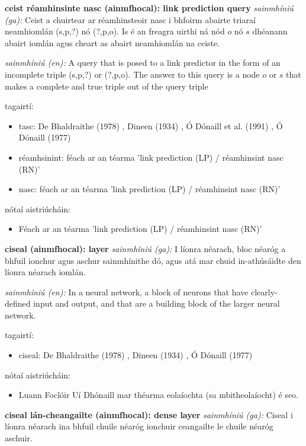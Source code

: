 \documentclass{article}
\begin{document}
\textbf{ceist réamhinsinte nasc (ainmfhocal): link prediction query}
\textit{sainmhíniú (ga):} Ceist a chuirtear ar réamhinsteoir nasc i bhfoirm abairte triaraí neamhiomlán (s,p,?) nó (?,p,o). Is é an freagra uirthi ná nód $o$ nó $s$ dhéanann abairt iomlán agus cheart as abairt neamhiomlán na ceiste.

\textit{sainmhíniú (en):} A query that is posed to a link predictor in the form of an incomplete triple (s,p,?) or (?,p,o). The answer to this query is a node $o$ or $s$ that makes a complete and true triple out of the query triple

tagairtí:
\begin{itemize}
	\item tasc: De Bhaldraithe (1978) \cite{de-bhaldraithe}, Dineen (1934) \cite{dineen}, Ó Dónaill et al. (1991) \cite{focloir-beag}, Ó Dónaill (1977) \cite{odonaill}
	\item réamhsinint: féach ar an téarma 'link prediction (LP) / réamhinsint nasc (RN)'
	\item nasc: féach ar an téarma 'link prediction (LP) / réamhinsint nasc (RN)'
\end{itemize}

nótaí aistriúcháin:
\begin{itemize}
	\item Féach ar an téarma 'link prediction (LP) / réamhinsint nasc (RN)'
\end{itemize}


\textbf{ciseal (ainmfhocal): layer}
\textit{sainmhíniú (ga):} I líonra néarach, bloc néaróg a bhfuil ionchur agus aschur sainmhínithe dó, agus atá mar chuid in-athúsáidte den líonra néarach iomlán.

\textit{sainmhíniú (en):} In a neural network, a block of neurons that have clearly-defined input and output, and that are a building block of the larger neural network.

tagairtí:
\begin{itemize}
	\item ciseal: De Bhaldraithe (1978) \cite{de-bhaldraithe}, Dineen (1934) \cite{dineen}, Ó Dónaill (1977) \cite{odonaill}
\end{itemize}

nótaí aistriúcháin:
\begin{itemize}
	\item Luann Foclóir Uí Dhónaill mar théarma eolaíochta (sa mbitheolaíocht) é seo.
\end{itemize}


\textbf{ciseal lán-cheangailte (ainmfhocal): dense layer}
\textit{sainmhíniú (ga):} Ciseal i líonra néarach ina bhfuil chuile néaróg ionchuir ceangailte le chuile néaróg aschuir.
\end{document}
